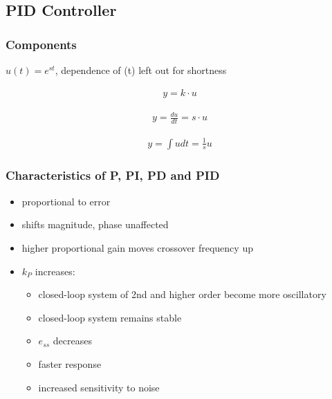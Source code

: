 \subsection{PID Controller}
    \subsubsection{Components}
        $u(t) = e^{st}$, dependence of (t) left out for shortness\\
        \begin{minipage}{0.28\linewidth}
            \begin{align*}
                y = k \cdot u
            \end{align*}
        \end{minipage}
        \begin{minipage}{0.32\linewidth}
            \begin{align*}
                y = \frac{du}{dt} = s \cdot u
            \end{align*}
        \end{minipage}
        \begin{minipage}{0.32\linewidth}
            \begin{align*}
                y = \int u dt = \frac{1}{s} u
            \end{align*}
        \end{minipage}
        \newcolumn
        
    \subsubsection{Characteristics of P, PI, PD and PID}
        \begin{itemize}
            \item proportional to error
            \item shifts magnitude, phase unaffected
            \item higher proportional gain moves crossover frequency up
            \item $k_P$ increases:
            \begin{itemize}
                \item closed-loop system of 2nd and higher order become more oscillatory
                \item closed-loop system remains stable
                \item $e_{ss}$ decreases
                \item faster response
                \item increased sensitivity to noise
            \end{itemize}
        \end{itemize}

